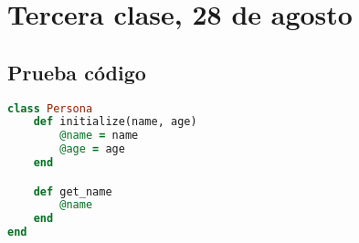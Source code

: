 \section{Tercera clase, 28 de agosto}

\subsection{Prueba código}

\vspace{.5cm}
\begin{lstlisting}[language=Ruby]
class Persona
    def initialize(name, age)
        @name = name
        @age = age
    end

    def get_name
        @name
    end
end
\end{lstlisting}
\vspace{.5cm}

